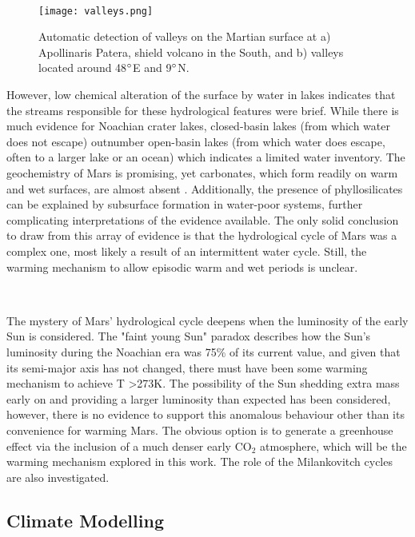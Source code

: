 \documentclass[12pt,onecolumn]{revtex4-2}    %
\begin{document}
\

\begin{figure}
\centering
\texttt{[image: valleys.png]}
\caption{Automatic detection of valleys on the Martian surface at a) Apollinaris Patera, shield volcano in the South, and b) valleys located around 48$\degree$E and 9$\degree$N. \cite{HBH10}}
\label{fig:test}
\end{figure}

However, low chemical alteration of the surface by water in lakes indicates that the streams responsible for these hydrological features were brief. While there is much evidence for Noachian crater lakes, closed-basin lakes (from which water does not escape) outnumber open-basin lakes (from which water does escape, often to a larger lake or an ocean) which indicates a limited water inventory. The geochemistry of Mars is promising, yet carbonates, which form readily on warm and wet surfaces, are almost absent \cite{C13} \cite{EE14}. Additionally, the presence of phyllosilicates can be explained by subsurface formation in water-poor systems, further complicating interpretations of the evidence available. The only solid conclusion to draw from this array of evidence is that the hydrological cycle of Mars was a complex one, most likely a result of an intermittent water cycle. Still, the warming mechanism to allow episodic warm and wet periods is unclear.

\

The mystery of Mars' hydrological cycle deepens when the luminosity of the early Sun is considered. The "faint young Sun" paradox describes how the Sun's luminosity during the Noachian era was 75\% of its current value, and given that its semi-major axis has not changed, there must have been some warming mechanism to achieve T \textgreater 273K. The possibility of the Sun shedding extra mass early on and providing a larger luminosity than expected has been considered, however, there is no evidence to support this anomalous behaviour other than its convenience for warming Mars. The obvious option is to generate a greenhouse effect via the inclusion of a much denser early $\mathrm{CO_2}$ atmosphere, which will be the warming mechanism explored in this work. The role of the Milankovitch cycles are also investigated.

\subsection{Climate Modelling}
\end{document}
